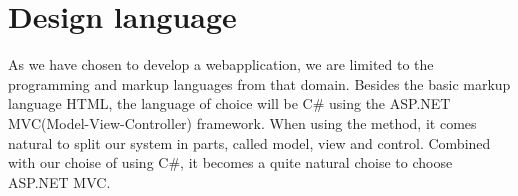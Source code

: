 \section{Design language}
\label{sec:design_language}

As we have chosen to develop a webapplication, we are limited to the programming and markup languages from that domain.
Besides the basic markup language HTML, the language of choice will be C\# using the ASP.NET MVC(Model-View-Controller) framework. When using the \ooad method, it comes natural to split our system in parts, called model, view and control. Combined with our choise of using C\#, it becomes a quite natural choise to choose ASP.NET MVC.